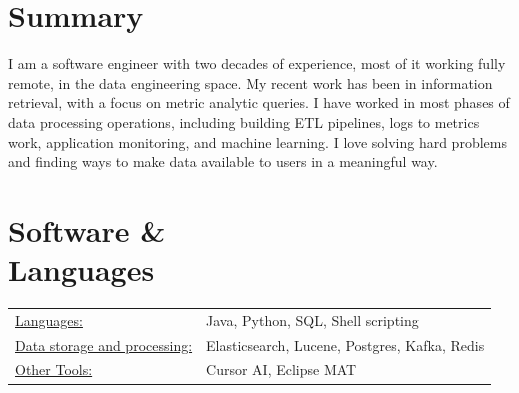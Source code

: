 \documentclass[margin]{res}
\begin{document}

\address{Baltimore, MD $\bullet$ (917) 678 3636 \\
\href{mailto:mark.tozzi@gmail.com}{mark.tozzi@gmail.com}
$\bullet$ GitHub: \href{https://github.com/not-napoleon}{not-napoleon}
}


\begin{resume}

\section{Summary}
I am a software engineer with two decades of experience, most of it working
fully remote, in the data engineering space.  My recent work has been in
information retrieval, with a focus on metric analytic queries. I have worked in
most phases of data processing operations, including building ETL pipelines,
logs to metrics work, application monitoring, and machine learning. I love 
solving hard problems and finding ways to make data available to users in a 
meaningful way.

\section{Software \& \\ Languages}
   \begin{tabular}{l p{3in}}
     \underline{Languages:} & Java, Python, SQL, Shell scripting \\
     \underline{Data storage and processing:} & Elasticsearch, Lucene, Postgres, Kafka, Redis \\
     \underline{Other Tools:} & Cursor AI, Eclipse MAT
   \end{tabular}

\raggedright{}

\end{resume}
\end{document}
